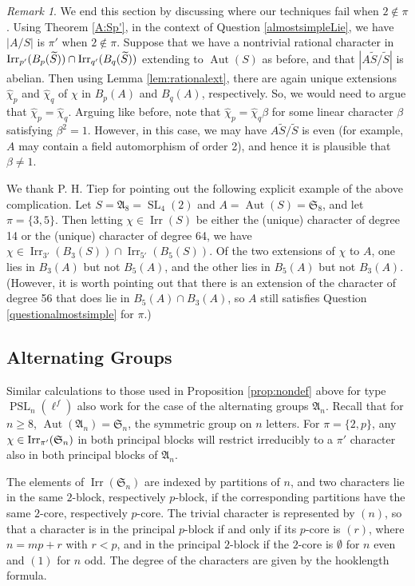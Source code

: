 \documentclass[12pt,leqno,a4paper]{amsart}
\newcommand{\Irr}{{\operatorname{Irr}}}
\newcommand{\SL}{{\operatorname{SL}}}
\newcommand{\PSL}{{\operatorname{PSL}}}
\newcommand{\alt}{\mathfrak{A}}
\newcommand{\sym}{\mathfrak{S}}
\def\irrp#1#2{{\rm Irr}_{#1'}(#2)}
\theoremstyle{remark}
\newtheorem{rem}[thm]{Remark}
\newcommand\wt[1]{\widetilde{#1}}
\newcommand{\aut}{\operatorname{Aut}}
\begin{document}
\begin{rem}\label{rem:oddp1complication}
We end this section by discussing where our techniques fail when $2\not\in\pi$. 
Using Theorem \ref{A:Sp'}, in the context of Question \ref{almostsimpleLie}, we have $|A/S|$ is $\pi'$ when $2\not\in\pi$. Suppose that we have a nontrivial rational character in $\irrp{p}{B_p(\wt{S})}\cap\irrp{q}{B_q(\wt{S})}$ extending to $\aut(S)$ as before, and that   $|A\wt{S}/\wt{S}|$ is abelian.  Then using Lemma \ref{lem:rationalext}, there are again unique extensions $\hat\chi_p$ and $\hat\chi_q$ of $\chi$ in $B_p(A)$ and $B_q(A)$, respectively.  So, we would need to argue that $\hat\chi_p=\hat\chi_q$.  Arguing like before, note that $\hat\chi_p=\hat\chi_q\beta$ for some linear character $\beta$ satisfying $\beta^2=1$.  However, in this case, we may have $A\wt{S}/\wt{S}$ is even (for example, $A$ may contain a field automorphism of order 2), and hence it is plausible that $\beta\neq 1$.

We thank P. H. Tiep for pointing out the following explicit example of the above complication. Let $S=\alt_8=\SL_4(2)$ and $A=\aut(S)=\sym_8$, and let $\pi=\{3,5\}$. Then letting $\chi\in\Irr(S)$ be either the (unique) character of degree 14 or the (unique) character of degree 64, we have $\chi\in\Irr_{3'}(B_3(S))\cap \Irr_{5'}(B_5(S))$. Of the two extensions of $\chi$ to $A$,  one lies in $B_3(A)$ but not $B_5(A)$, and the other lies in $B_5(A)$ but not $B_3(A)$.  (However, it is worth pointing out that there is an extension of the character of degree 56 that does lie in $B_5(A)\cap B_3(A)$, so $A$ still satisfies Question \ref{questionalmostsimple} for $\pi$.)
\end{rem}





\subsection{Alternating Groups}

Similar calculations to those used in Proposition \ref{prop:nondef} above for type $\PSL_n(\ell^f)$ 
 also work for the case of the alternating groups $\alt_n$.  Recall that for $n\geq 8$, $\aut(\alt_n)=\sym_n$, the symmetric group on $n$ letters.  For $\pi=\{2,p\}$, any $\chi\in\irrp{\pi}{\sym_n}$ in both principal blocks will restrict irreducibly to a $\pi'$ character also in both principal blocks of $\alt_n$.

The elements of $\Irr(\sym_n)$ are indexed by partitions of $n$, and two characters lie in the same $2$-block, respectively $p$-block, if the corresponding partitions have the same $2$-core, respectively $p$-core.  The trivial character is represented by $(n)$, so that a character is in the principal $p$-block if and only if its $p$-core is $(r)$, where $n=mp+r$ with $r<p$, and in the principal $2$-block if the $2$-core is $\emptyset$ for $n$ even and $(1)$ for $n$ odd.  The degree of the characters are given by the hooklength formula.
\end{document}
